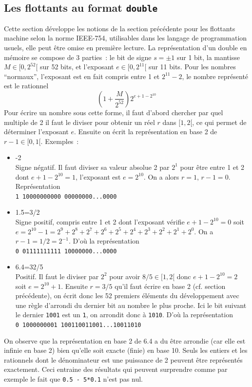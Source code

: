 \documentclass[a4paper,11pt]{book}
\begin{document}
\begin{giacjshere}
\subsection{Les flottants au format {\tt double}} 
 
Cette section d\'eveloppe les notions de la section pr\'ec\'edente
pour les flottants machine selon la norme IEEE-754, utilisables dans les langage de
programmation usuels, elle peut \^etre omise en première lecture.
La représentation d'un double
en mémoire se compose de 3 parties~: le bit 
de signe $s=\pm 1$ sur 1 bit, 
la mantisse $M \in [0,2^{52}[$ sur 52 bits, 
et l'exposant $e \in [0, 2^{11}[$ sur 11 bits. Pour les nombres
``normaux'', l'exposant est en fait compris entre 1 et $2^{11}-2$,
le nombre repr\'esent\'e est le rationnel
\[ (1+\frac{M}{2^{52}}) 2^{e+1-2^{10}} \]
Pour \'ecrire un nombre sous cette forme, il faut d'abord chercher par
quel multiple de 2 il faut le diviser pour obtenir un r\'eel $r$ dans
$[1,2[$, ce qui permet de d\'eterminer l'exposant $e$. Ensuite on
\'ecrit la repr\'esentation en base 2 de $r-1 \in [0,1[$.
Exemples~:
\begin{itemize}
\item -2 \\
Signe n\'egatif. Il faut diviser sa valeur absolue 
2 par $2^1$ pour \^etre entre 1 et 2 dont
$e+1-2^{10}=1$, l'exposant est $e=2^{10}$. On a alors $r=1$, $r-1=0$.
Repr\'esentation \\
\verb|1 10000000000 00000000...0000|
\item 1.5=3/2\\
Signe positif, compris entre 1 et 2 dont l'exposant v\'erifie
$e+1-2^{10}=0$ soit
$e=2^{10}-1=2^9+2^8+2^7+2^6+2^5+2^4+2^3+2^2+2^1+2^0$. 
On a $r-1=1/2=2^{-1}$. D'o\`u la repr\'esentation\\
\verb|0 01111111111 10000000...0000|
\item 6.4=32/5\\
Positif. Il faut le diviser par $2^{2}$ pour avoir $8/5 \in [1,2[$
donc $e+1-2^{10}=2$ soit $e=2^{10}+1$. Ensuite $r=3/5$ qu'il faut
\'ecrire en base 2 (cf. section pr\'ec\'edente),
on \'ecrit donc les 52 premiers \'el\'ements du d\'eveloppement
avec une r\`egle d'arrondi du dernier bit au nombre le plus proche. 
Ici le bit suivant le dernier \verb|1001| est un \verb|1|, on arrondit
donc \`a \verb|1010|. D'o\`u la repr\'esentation\\
\verb|0 1000000001 100110011001...10011010|\\
\end{itemize}
On observe que la repr\'esentation en base 2 de 6.4 a du \^etre
arrondie (car elle est infinie en base 2) bien qu'elle soit exacte
(finie) en base 10.
Seuls les entiers et les rationnels dont le d\'enominateur est une puissance
de 2 peuvent \^etre repr\'esent\'es exactement.
Ceci entraine des r\'esultats qui peuvent surprendre
comme par exemple le fait que
\verb|0.5 - 5*0.1| n'est pas nul.


\end{giacjshere}
\end{document}

